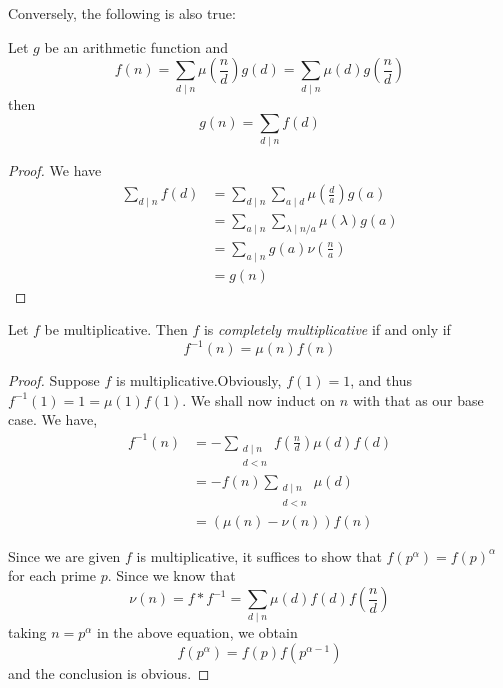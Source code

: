 Conversely, the following is also true:
\begin{theorem}
    Let $g$ be an arithmetic function and 
    \begin{equation*}
        f(n) = \sum_{d\mid n}\mu\left(\frac{n}{d}\right)g(d) = \sum_{d\mid n}\mu(d)g\left(\frac{n}{d}\right)
    \end{equation*}
    then 
    \begin{equation*}
        g(n) = \sum_{d\mid n}f(d)
    \end{equation*}
\end{theorem}
\begin{proof}
    We have 
    \begin{align*}
        \sum_{d\mid n}f(d) &= \sum_{d\mid n}\sum_{a\mid d}\mu\left(\frac{d}{a}\right)g(a)\\
        &= \sum_{a\mid n}\sum_{\lambda\mid n/a}\mu(\lambda)g(a)\\
        &= \sum_{a\mid n}g(a)\nu\left(\frac{n}{a}\right)\\
        &= g(n)
    \end{align*}
\end{proof}

\begin{theorem}
    Let $f$ be multiplicative. Then $f$ is \textit{completely multiplicative} if and only if 
    \begin{equation*}
        f^{-1}(n) = \mu(n) f(n)
    \end{equation*}
\end{theorem}
\begin{proof}
    Suppose $f$ is multiplicative.Obviously, $f(1) = 1$, and thus $f^{-1}(1) = 1 = \mu(1)f(1)$. We shall now induct on $n$ with that as our base case. We have,
    \begin{align*}
        f^{-1}(n) &= -\sum_{\substack{d\mid n\\d < n}}f\left(\frac{n}{d}\right)\mu(d)f(d)\\
        &= -f(n)\sum_{\substack{d\mid n\\d < n}}\mu(d)\\
        &= (\mu(n) - \nu(n))f(n)
    \end{align*}

    Since we are given $f$ is multiplicative, it suffices to show that $f(p^\alpha) = f(p)^\alpha$ for each prime $p$. Since we know that 
    \begin{equation*}
        \nu(n) = f*f^{-1} = \sum_{d\mid n}\mu(d)f(d)f\left(\frac{n}{d}\right)
    \end{equation*}
    taking $n = p^\alpha$ in the above equation, we obtain
    \begin{equation*}
        f(p^\alpha) = f(p)f(p^{\alpha - 1})
    \end{equation*}
    and the conclusion is obvious.
\end{proof}

